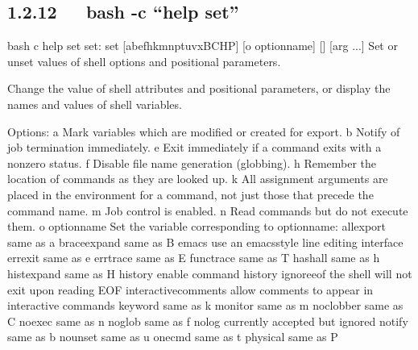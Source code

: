 \documentclass[letterpaper,12pt,english]{sphinxmanual}
\begin{document}
\subsection{1.2.12   bash -c “help set”}
\label{\detokenize{001software/001install/linux:bash-c-help-set}}
\begin{sphinxVerbatim}[commandchars=\\\{\}]
\PYGZdl{} bash \PYGZhy{}c \PYGZdq{}help set\PYGZdq{}
set: set [\PYGZhy{}abefhkmnptuvxBCHP] [\PYGZhy{}o option\PYGZhy{}name] [\PYGZhy{}\PYGZhy{}] [arg ...]
    Set or unset values of shell options and positional parameters.

    Change the value of shell attributes and positional parameters, or
    display the names and values of shell variables.

    Options:
      \PYGZhy{}a  Mark variables which are modified or created for export.
      \PYGZhy{}b  Notify of job termination immediately.
      \PYGZhy{}e  Exit immediately if a command exits with a non\PYGZhy{}zero status.
      \PYGZhy{}f  Disable file name generation (globbing).
      \PYGZhy{}h  Remember the location of commands as they are looked up.
      \PYGZhy{}k  All assignment arguments are placed in the environment for a
          command, not just those that precede the command name.
      \PYGZhy{}m  Job control is enabled.
      \PYGZhy{}n  Read commands but do not execute them.
      \PYGZhy{}o option\PYGZhy{}name
          Set the variable corresponding to option\PYGZhy{}name:
              allexport    same as \PYGZhy{}a
              braceexpand  same as \PYGZhy{}B
              emacs        use an emacs\PYGZhy{}style line editing interface
              errexit      same as \PYGZhy{}e
              errtrace     same as \PYGZhy{}E
              functrace    same as \PYGZhy{}T
              hashall      same as \PYGZhy{}h
              histexpand   same as \PYGZhy{}H
              history      enable command history
              ignoreeof    the shell will not exit upon reading EOF
              interactive\PYGZhy{}comments
                           allow comments to appear in interactive commands
              keyword      same as \PYGZhy{}k
              monitor      same as \PYGZhy{}m
              noclobber    same as \PYGZhy{}C
              noexec       same as \PYGZhy{}n
              noglob       same as \PYGZhy{}f
              nolog        currently accepted but ignored
              notify       same as \PYGZhy{}b
              nounset      same as \PYGZhy{}u
              onecmd       same as \PYGZhy{}t
              physical     same as \PYGZhy{}P

\end{sphinxVerbatim}
\end{document}
